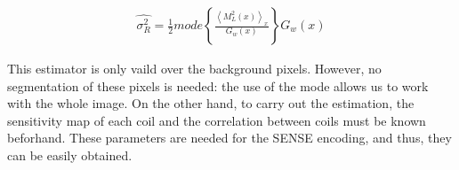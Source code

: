 \begin{equation}
\begin{aligned}\widehat{\sigma_{R}^{2}}=\frac{1}{2}mode\left\{ \frac{\left\langle M_{L}^{2}(x)\right\rangle _{x}}{G_{w}(x)}\right\} G_{w}(x)\end{aligned}
\end{equation}

This estimator is only vaild over the background pixels. However,
no segmentation of these pixels is needed: the use of the mode allows
us to work with the whole image. On the other hand, to carry out the
estimation, the sensitivity map of each coil and the correlation between
coils must be known beforhand. These parameters are needed for the
SENSE encoding, and thus, they can be easily obtained.